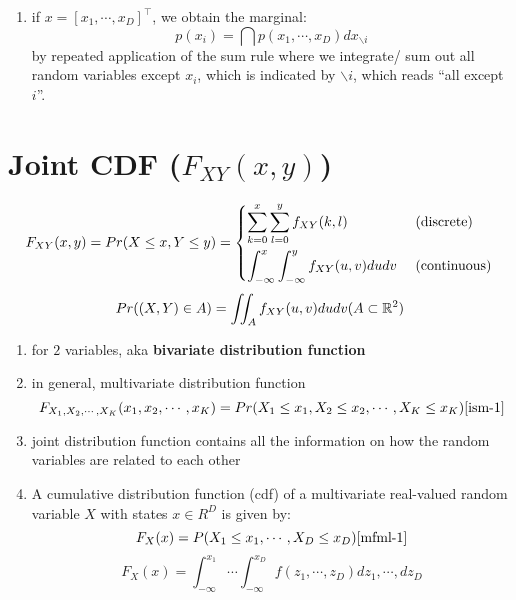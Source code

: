 \begin{enumerate}
    \item if $x = [x_1, \cdots , x_D]^\top$, we obtain the marginal:\cite{mfml-1}
    \[
        p(x_i) = \dint
        p(x_1, \cdots , x_D)dx_{\backslash i}
    \]
    by repeated application of the sum rule where we integrate/ sum out all random variables except $x_i$, which is indicated by $\backslash i$, which reads “all except $i$”.

\end{enumerate}

\section{Joint CDF ($F_{XY}(x, y)$) \cite{ism-1,mfml-1}} \label{Multivariate Distributions: joint CDF}

\[
    F_{XY}(x, y)
    = Pr(X \leq x, Y \leq y) 
    = \begin{cases}
        \displaystyle\sum_{k=0}^{x}
        \displaystyle\sum_{l=0}^{y} f_{XY}(k,l) & \text{ (discrete)}\\[3ex]
        \displaystyle\int_{-\infty}^{x}
        \displaystyle\int_{-\infty}^{y} 
        f_{XY}(u,v)dudv & \text{ (continuous)}\\
    \end{cases}
\]
\[
    Pr((X,Y)\in A) 
    = \displaystyle\iint_A f_{XY}(u,v) dudv
    \hfill
    (A \subset \mathbb{R}^2)
\]

\begin{enumerate}
    \item for $2$ variables, aka \textbf{bivariate distribution function}

    \item in general, multivariate distribution function
    \[
        F_{X_1,X_2,\cdots,X_K}(x_1,x_2,\cdots,x_K)
        = Pr(X_1 \leq x_1, X_2 \leq x_2,\cdots,X_K \leq x_K)
        \hfill
        \text{\cite{ism-1}}
    \]

    \item joint distribution function contains all the information on how the random variables are related to each other

    \item A cumulative distribution function (cdf) of a multivariate real-valued random variable $X$ with states $x \in R^D$ is given by: \cite{mfml-1}
    \[
        F_X(x) = P(X_1 \leq x_1, \cdots , X_D \leq x_D)
        \hfill
        \text{\cite{mfml-1}}
    \]
    \[
        \displaystyle
        F_X(x) =
        \int_{-\infty}^{x_1}
        \cdots
        \int_{-\infty}^{x_D}
        f(z_1,\cdots,z_D) dz_1,\cdots,dz_D
    \]
\end{enumerate}

